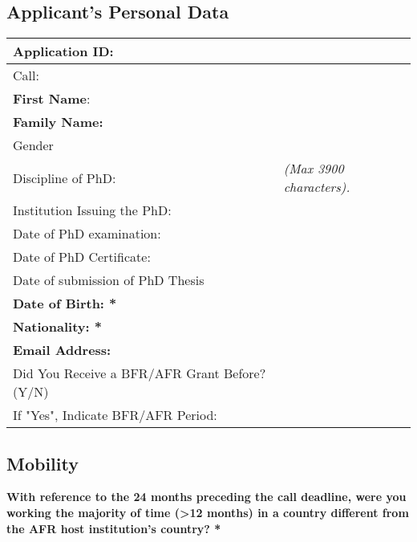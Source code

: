 %

\subsection{Applicant's Personal Data}

\begin{table}[H]
    \centering\small
    \begin{tabular}{|p{}|p{}|}
        \hline
        Application ID:        & \\\hline
        Call:                  & \\\hline
        \textbf{First Name}:   &  \\\hline
        \textbf{Family Name:}  & \\\hline
        Gender                 & \\\hline
        Discipline of PhD:     & \emph{(Max 3900 characters).}

        \\\hline
        Institution Issuing the PhD: & \\\hline
        Date of PhD examination: & \\\hline
        Date of PhD Certificate: & \\\hline
        Date of submission of PhD Thesis & \\\hline
        \textbf{Date of Birth: *} & \\\hline
        \textbf{Nationality: *}   & \\\hline
        \textbf{Email Address:}   & \\\hline
        Did You Receive a BFR/AFR Grant Before? (Y/N) & \\\hline
        If "Yes", Indicate BFR/AFR Period: & \\
       \hline
    \end{tabular}
\end{table}

\subsection{Mobility}

\textbf{With reference to the 24 months preceding the call deadline, were you working the majority of time (>12 months) in a country different from the AFR host institution's country? *}

